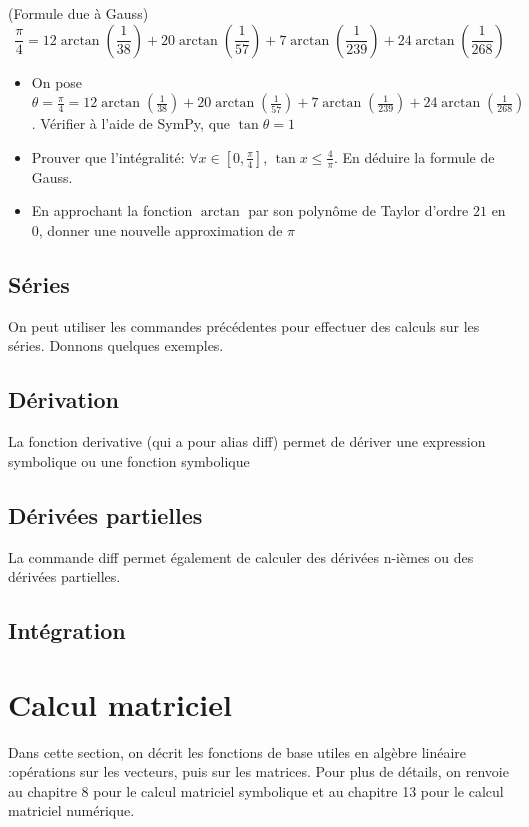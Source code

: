\begin{exercise}
 \end{exercise}
 \begin{exercise}(Formule due \`a Gauss)
 \[
 \frac{\pi}{4} = 12\arctan(\frac{1}{38})+20\arctan(\frac{1}{57})+7\arctan(\frac{1}{239})+24\arctan(\frac{1}{268})
 \]
 \begin{itemize}
  \item On pose $\theta = \frac{\pi}{4} = 12\arctan(\frac{1}{38})+20\arctan(\frac{1}{57})+7\arctan(\frac{1}{239})+24\arctan(\frac{1}{268})$. Vérifier à l'aide de SymPy, que $\tan\theta = 1$
  \item Prouver que l'intégralité: $\forall x \in \left[0,\frac{\pi}{4}\right]$, $\tan x \leq \frac{4}{\pi}$. En déduire la formule de Gauss.
  \item En approchant la fonction $\arctan$ par son polynôme de Taylor d’ordre $21$ en $0$, donner une nouvelle approximation de $\pi$
 \end{itemize}
 \end{exercise}
 \begin{exercise}
 \end{exercise}
 \subsection{Séries}
  On peut utiliser les commandes précédentes pour effectuer des calculs sur les séries. Donnons quelques exemples.
 \subsection{Dérivation}
 La fonction derivative (qui a pour alias diff) permet de dériver une expression symbolique ou une fonction symbolique
 \subsection{Dérivées partielles}
 La commande diff permet également de calculer des dérivées n-ièmes ou des dérivées partielles.
 \subsection{Intégration}
 \section{Calcul matriciel}
  Dans cette section, on décrit les fonctions de base utiles en algèbre linéaire :opérations sur les vecteurs, puis sur les matrices. Pour plus de détails, on renvoie au chapitre 8 pour le calcul matriciel symbolique et au chapitre 13 pour le calcul matriciel numérique.
